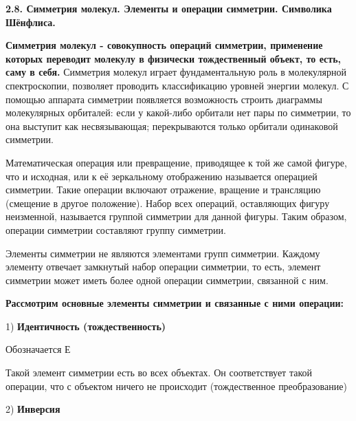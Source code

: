 
\large\textbf{2.8. Симметрия молекул. Элементы и операции симметрии. Символика Шёнфлиса.} 

\par\bigskip
	
\textbf{Симметрия молекул - совокупность операций симметрии,
	применение которых переводит молекулу в физически
	тождественный объект, то есть, саму в себя.} Симметрия молекул
играет фундаментальную роль в молекулярной спектроскопии,
позволяет проводить классификацию уровней энергии молекул. С
помощью аппарата симметрии появляется возможность строить
диаграммы молекулярных орбиталей: если у какой-либо орбитали
нет пары по симметрии, то она выступит как несвязывающая;
перекрываются только орбитали одинаковой симметрии.

\par\smallskip

Математическая операция или превращение, приводящее к той же
самой фигуре, что и исходная, или к её зеркальному отображению
называется операцией симметрии. Такие операции включают
отражение, вращение и трансляцию (смещение в другое
положение). Набор всех операций, оставляющих фигуру
неизменной, называется группой симметрии для данной фигуры.
Таким образом, операции симметрии составляют группу
симметрии.

\par\smallskip

Элементы симметрии не являются элементами групп симметрии.
Каждому элементу отвечает замкнутый набор операции симметрии,
то есть, элемент симметрии может иметь более одной операции
симметрии, связанной с ним.

\begin{center}
\textbf{Рассмотрим основные элементы симметрии и связанные с ними
	операции:}
\end{center}

1) \textbf{Идентичность (тождественность)}

\par\smallskip

Обозначается Е

\par\smallskip

Такой элемент симметрии есть во всех объектах. Он
соответствует такой операции, что с объектом ничего не
происходит (тождественное преобразование)

\par\smallskip

2) \textbf{Инверсия} 

\par\smallskip

